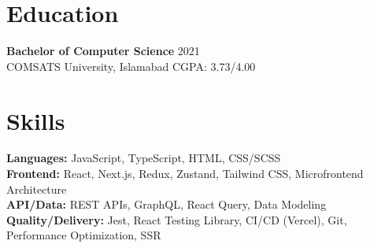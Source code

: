 \documentclass[9pt,letterpaper]{article}
\begin{document}
\section*{Education}
\textbf{Bachelor of Computer Science} \hfill 2021 \\
COMSATS University, Islamabad \hfill CGPA: 3.73/4.00

\section*{Skills}
\textbf{Languages:} JavaScript, TypeScript, HTML, CSS/SCSS \\
\textbf{Frontend:} React, Next.js, Redux, Zustand, Tailwind CSS, Microfrontend Architecture \\
\textbf{API/Data:} REST APIs, GraphQL, React Query, Data Modeling \\
\textbf{Quality/Delivery:} Jest, React Testing Library, CI/CD (Vercel), Git, Performance Optimization, SSR
\end{document}
